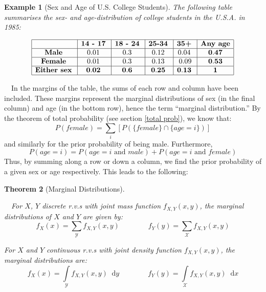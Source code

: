 \documentclass[12pt,a4paper]{article}
\newcommand{\diff}{\;\mathrm{d}}
\newtheorem{thm}{Theorem}[subsection]
\newtheorem{ex}[thm]{Example}
\begin{document}
\begin{ex}[Sex and Age of U.S. College Students]
\vspace{1cm}

The following table summarises the sex- and age-distribution of college students in the U.S.A. in 1985:

\begin{center}
$$\begin{array}{|c|c|c|c|c|c|} \hline
\quad & \textbf{14 - 17} \; & \textbf{18 - 24} \; & \textbf{25-34} \; & \textbf{35+}\; & \mbox{\textbf{Any age}}\\ \hline
\text{\textbf{Male}}\; & 0.01\; & 0.3\; & 0.12\; & 0.04\; & \mathbf{0.47} \\ \hline
\mbox{\textbf{Female}}\; & 0.01\; & 0.3\; & 0.13\; & 0.09 & \mathbf{0.53}\\ \hline
\mbox{\textbf{Either sex}}\; & \mathbf{0.02}\; & \mathbf{0.6}\; & \mathbf{0.25} \; & \mathbf{0.13}\; & \mathbf{1}\\ \hline
\end{array}$$
\end{center}

\end{ex}
$\quad$In the margins of the table, the sums of each row and column have been included. These margins represent the marginal distributions of sex (in the final column) and age (in the bottom row), hence the term ``marginal distribution.'' By the theorem of total probability (see section \ref{total prob}), we know that:
$$P(female) = \sum\limits_i [P(\{female\} \cap \{age = i\})]$$
and similarly for the prior probability of being male. Furthermore,
$$P(age = i) = P(age = i \text{ and } male) +P(age = i \text{ and } female)$$
Thus, by summing along a row or down a column, we find the prior probability of a given sex or age respectively. This leads to the following:

\begin{thm}[Marginal Distributions]$\quad$\par
\vspace{1cm}

$\quad$For $X$, $Y$ discrete r.v.s with joint mass function $f_{X,Y}(x,y)$, the marginal distributions of $X$ and $Y$ are given by:
$$f_X(x) = \sum\limits_{\mathcal{Y}} f_{X,Y}(x,y) \qquad\qquad f_Y(y) = \sum\limits_{\mathcal{X}} f_{X,Y}(x,y)$$

For $X$ and $Y$ continuous r.v.s with joint density function $f_{X,Y}(x,y)$, the marginal distributions are:
$$f_X(x) = \int\limits_{\mathcal{Y}}\!\! f_{X,Y}(x,y)\; \diff y \qquad\qquad f_Y(y) = \int\limits_{\mathcal{X}} \!\! f_{X,Y}(x,y)\; \diff x$$

\end{thm}
\end{document}

